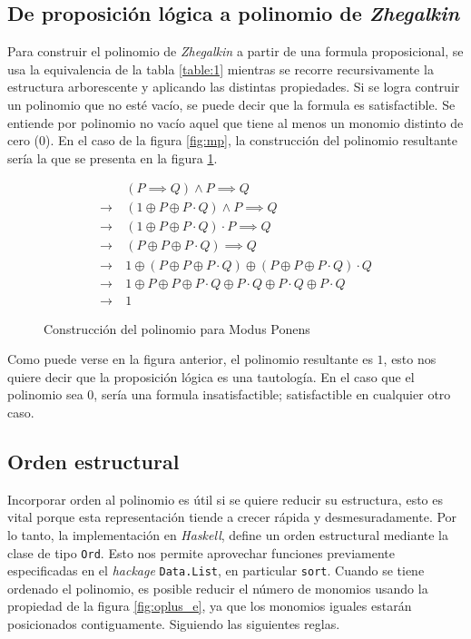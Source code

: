 \subsection{De proposición lógica a polinomio de \textit{Zhegalkin}}
\label{sec:fromProp}

Para construir el polinomio de \textit{Zhegalkin} a partir de una formula proposicional, se usa la equivalencia de la tabla \ref{table:1} mientras se recorre recursivamente la estructura arborescente y aplicando las distintas propiedades. Si se logra contruir un polinomio que no esté vacío, se puede decir que la formula es satisfactible. Se entiende por polinomio no vacío aquel que tiene al menos un monomio distinto de cero ($0$). En el caso de la figura \ref{fig:mp}, la construcción del polinomio resultante sería la que se presenta en la figura \ref{fig:mp_anf}.

\begin{figure}[!ht]
\begin{align*}
                 & (P\implies Q)\land P \implies Q\\
    \rightarrow\ & (1 \oplus P \oplus P\cdot Q)\land P \implies Q\\
    \rightarrow\ & (1 \oplus P \oplus P\cdot Q)\cdot P \implies Q\\
    \rightarrow\ & (P \oplus P \oplus P\cdot Q) \implies Q\\
    \rightarrow\ & 1 \oplus (P \oplus P \oplus P\cdot Q) \oplus (P \oplus P \oplus P\cdot Q)\cdot Q\\
    \rightarrow\ & 1 \oplus P \oplus P \oplus P\cdot Q \oplus P\cdot Q\oplus P\cdot Q \oplus P\cdot Q \\
    \rightarrow\ & 1
\end{align*}
\caption{Construcción del polinomio para Modus Ponens}
\label{fig:mp_anf}
\end{figure}

Como puede verse en la figura anterior, el polinomio resultante es $1$, esto nos quiere decir que la proposición lógica es una tautología. En el caso que el polinomio sea $0$, sería una formula insatisfactible; satisfactible en cualquier otro caso.

\subsection{Orden estructural}

Incorporar orden al polinomio es útil si se quiere reducir su estructura, esto es vital porque esta representación tiende a crecer rápida y desmesuradamente. Por lo tanto, la implementación en \textit{Haskell}, define un orden estructural mediante la clase de tipo \texttt{Ord}. Esto nos permite aprovechar funciones previamente especificadas en el \textit{hackage} \texttt{Data.List}, en particular \texttt{sort}. Cuando se tiene ordenado el polinomio, es posible reducir el número de monomios usando la propiedad de la figura \ref{fig:oplus_e}, ya que los monomios iguales estarán posicionados contiguamente. Siguiendo las siguientes reglas.

